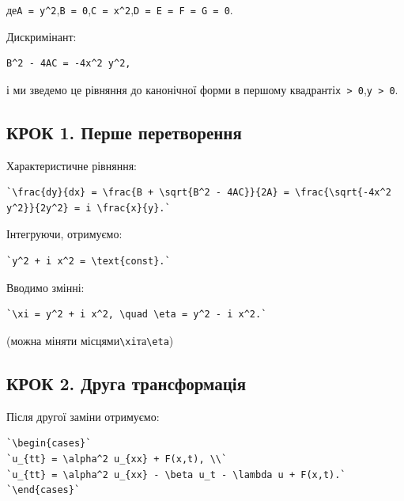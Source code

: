 \documentclass[
  ukrainian,
]{article}
\begin{document}
де\texttt{A\ =\ y\^{}2},\texttt{B\ =\ 0},\texttt{C\ =\ x\^{}2},\texttt{D\ =\ E\ =\ F\ =\ G\ =\ 0}.

Дискримінант:

\begin{verbatim}
B^2 - 4AC = -4x^2 y^2,
\end{verbatim}

і ми зведемо це рівняння до канонічної форми в першому
квадранті\texttt{x\ \textgreater{}\ 0},\texttt{y\ \textgreater{}\ 0}.

\subsection{КРОК 1. Перше
перетворення}\label{ux43aux440ux43eux43a-1.-ux43fux435ux440ux448ux435-ux43fux435ux440ux435ux442ux432ux43eux440ux435ux43dux43dux44f}

Характеристичне рівняння:

\begin{verbatim}
`\frac{dy}{dx} = \frac{B + \sqrt{B^2 - 4AC}}{2A} = \frac{\sqrt{-4x^2 y^2}}{2y^2} = i \frac{x}{y}.`
\end{verbatim}

Інтегруючи, отримуємо:

\begin{verbatim}
`y^2 + i x^2 = \text{const}.`
\end{verbatim}

Вводимо змінні:

\begin{verbatim}
`\xi = y^2 + i x^2, \quad \eta = y^2 - i x^2.`
\end{verbatim}

(можна міняти
місцями\texttt{\textbackslash{}xi}та\texttt{\textbackslash{}eta})

\subsection{КРОК 2. Друга
трансформація}\label{ux43aux440ux43eux43a-2.-ux434ux440ux443ux433ux430-ux442ux440ux430ux43dux441ux444ux43eux440ux43cux430ux446ux456ux44f}

Після другої заміни отримуємо:

\begin{verbatim}
`\begin{cases}`
`u_{tt} = \alpha^2 u_{xx} + F(x,t), \\`
`u_{tt} = \alpha^2 u_{xx} - \beta u_t - \lambda u + F(x,t).`
`\end{cases}`
\end{verbatim}
\end{document}

